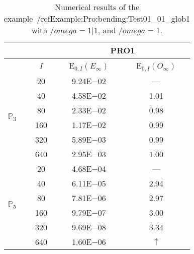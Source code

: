\begin{table}[H]
\caption{Numerical results of the example~/ref{Example:Pro:bending:Test01_01_glob1} with $/omega=1|1$, and $/omega=1$.}
\setlength{\tabcolsep}{5pt}
\centering
\begin{tabular}{@{}l c c c@{}}
\toprule
 &  & \multicolumn{2}{c}{PRO1}\\
\midrule
 & $I$ & E$_{0,I}(E_{\infty})$ & E$_{0,I}(O_{\infty})$\\
\midrule
\multirow{6}{*}{$\mathbb{P}_{3}$}
 & 20 & 9.24E$-$02 & ---\\
 & 40 & 4.58E$-$02 & 1.01\\
 & 80 & 2.33E$-$02 & 0.98\\
 & 160 & 1.17E$-$02 & 0.99\\
 & 320 & 5.89E$-$03 & 0.99\\
 & 640 & 2.95E$-$03 & 1.00\\
\midrule
\multirow{6}{*}{$\mathbb{P}_{5}$}
 & 20 & 4.68E$-$04 & ---\\
 & 40 & 6.11E$-$05 & 2.94\\
 & 80 & 7.81E$-$06 & 2.97\\
 & 160 & 9.79E$-$07 & 3.00\\
 & 320 & 9.69E$-$08 & 3.34\\
 & 640 & 1.60E$-$06 & $\uparrow$\\
\bottomrule
\end{tabular}
\label{Table:PRO:test_01_01_test4_pro1}
\end{table}
